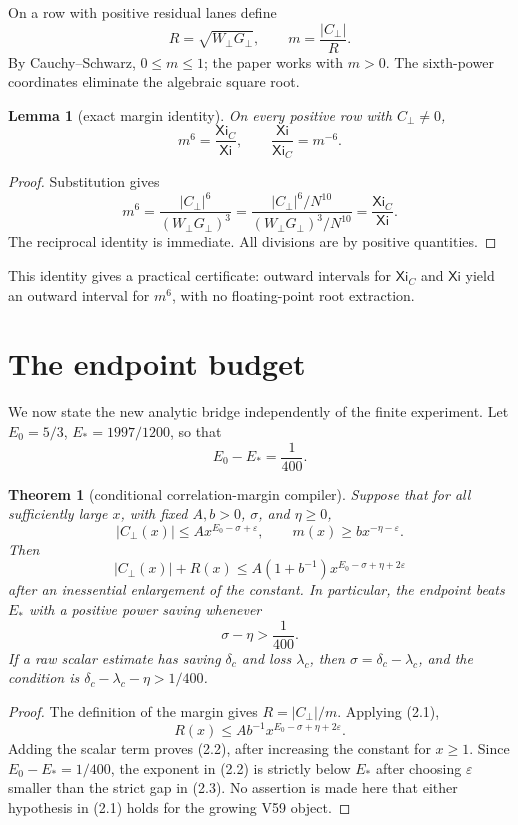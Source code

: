 \documentclass[11pt]{article}
\newcommand{\Cp}{C_{\perp}}
\newcommand{\Wp}{W_{\perp}}
\newcommand{\Gp}{G_{\perp}}
\newcommand{\XiN}{\mathsf{Xi}}
\newcommand{\Xic}{\mathsf{Xi}_{C}}
\newcommand{\marg}{m}
\newtheorem{theorem}{Theorem}
\newtheorem{lemma}{Lemma}
\begin{document}
On a row with positive residual lanes define
\[
 R=\sqrt{\Wp\Gp},\qquad \marg=\frac{|\Cp|}{R}.
\]
By Cauchy--Schwarz, \(0\leq\marg\leq1\); the paper works with
\(\marg>0\).  The sixth-power coordinates eliminate the algebraic square
root.

\begin{lemma}[exact margin identity]
On every positive row with \(\Cp\ne0\),
\[
 \marg^6=\frac{\Xic}{\XiN},\qquad
 \frac{\XiN}{\Xic}=\marg^{-6}.
\]
\end{lemma}

\begin{proof}
Substitution gives
\[
 \marg^6=\frac{|\Cp|^6}{(\Wp\Gp)^3}
 =\frac{|\Cp|^6/N^{10}}{(\Wp\Gp)^3/N^{10}}
 =\frac{\Xic}{\XiN}.
\]
The reciprocal identity is immediate.  All divisions are by positive
quantities.
\end{proof}

This identity gives a practical certificate: outward intervals for \(\Xic\)
and \(\XiN\) yield an outward interval for \(\marg^6\), with no floating-point
root extraction.

\section{The endpoint budget}

We now state the new analytic bridge independently of the finite experiment.
Let \(E_0=5/3\), \(E_*=1997/1200\), so that
\[
 E_0-E_* = \frac{1}{400}.
\]

\begin{theorem}[conditional correlation-margin compiler]
Suppose that for all sufficiently large \(x\), with fixed \(A,b>0\),
\(\sigma\), and \(\eta\geq0\),
\[
 |\Cp(x)|\leq A x^{E_0-\sigma+\varepsilon},
 \qquad
 \marg(x)\geq b x^{-\eta-\varepsilon}.
 \tag{2.1}
\]
Then
\[
 |\Cp(x)|+R(x)
 \leq A(1+b^{-1})x^{E_0-\sigma+\eta+2\varepsilon}
 \tag{2.2}
\]
after an inessential enlargement of the constant.  In particular, the
endpoint beats \(E_*\) with a positive power saving whenever
\[
 \sigma-\eta>\frac{1}{400}.
 \tag{2.3}
\]
If a raw scalar estimate has saving \(\delta_c\) and loss \(\lambda_c\),
then \(\sigma=\delta_c-\lambda_c\), and the condition is
\(\delta_c-\lambda_c-\eta>1/400\).
\end{theorem}

\begin{proof}
The definition of the margin gives \(R=|\Cp|/\marg\).  Applying (2.1),
\[
 R(x)\leq A b^{-1}x^{E_0-\sigma+\eta+2\varepsilon}.
\]
Adding the scalar term proves (2.2), after increasing the constant for
\(x\geq1\).  Since \(E_0-E_*=1/400\), the exponent in (2.2) is strictly
below \(E_*\) after choosing \(\varepsilon\) smaller than the strict gap in
(2.3).  No assertion is made here that either hypothesis in (2.1) holds for
the growing V59 object.
\end{proof}
\end{document}
